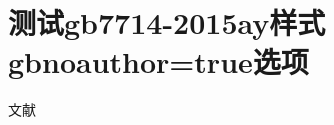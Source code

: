 \documentclass[twoside]{article}
\begin{document}

\section{测试gb7714-2015ay样式gbnoauthor=true选项}
文献
\cite{1962-50-50,2009-155-155}

\cite{olnoauthorcn}
\cite{olnoauthoren}
\cite{Allianceurlonly}


{
\printbibliography%
}
\end{document}

